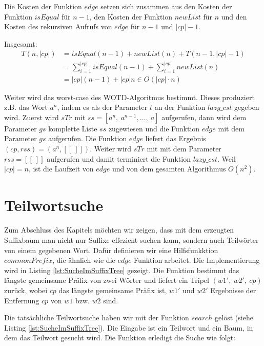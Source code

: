 \documentclass[12pt]{report}
\newcommand{\abs}[1]{\left|#1\right|}
\begin{document}
Die Kosten der Funktion $edge$ setzen sich zusammen aus den Kosten der Funktion $isEqual$ für $n - 1$, den Kosten der Funktion $newList$ für $n$ und den Kosten des rekursiven Aufrufs von $edge$ für $n - 1$ und $\abs{cp} - 1$.

Insgesamt:
\begin{align*}
    T(n,\abs{cp}) &= isEqual(n - 1) + newList(n) + T(n-1,\abs{cp}-1) \\
                  &= \sum_{i = 1}^{\abs{cp}}{isEqual(n-1)} + \sum_{i = 1}^{\abs{cp}}{newList(n)}\\
                  &= \abs{cp} (n - 1) + \abs{cp} n \in O(\abs{cp} \cdot n)
\end{align*}

Weiter wird das worst-case des WOTD-Algoritmus bestimmt. Dieses produziert z.B. das Wort $a^n$, indem es als der Parameter $t$ an der Funktion $lazy\_cst$ gegeben wird. Zuerst wird $sTr$ mit $ss = [a^n,\:a^{n-1}, \dots ,\:a]$ aufgerufen, dann wird dem Parameter $gs$ komplette Liste $ss$ zugewiesen und die Funktion $edge$ mit dem Parameter $gs$ aufgerufen. Die Funktion $edge$ liefert das Ergebnis $(cp,rss) = (a^n, [[\:]])$. Weiter wird $sTr$ mit mit dem Parameter $rss = [[\:]]$ aufgerufen und damit terminiert die Funktion $lazy\_cst$. Weil $|cp| = n$, ist die Laufzeit von $edge$ und von dem gesamten Algorithmus $O(n^2)$.

\section{Teilwortsuche}
\label{sec:Teilwortsuche}

Zum Abschluss des Kapitels möchten wir zeigen, dass mit dem erzeugten Suffixbaum man nicht nur Suffixe effezient suchen kann, sondern auch Teilwörter von einem gegebenen Wort. Dafür definieren wir eine Hilfsfunkktion $commonPrefix$, die ähnlich wie die $edge$-Funktion arbeitet. Die Implementierung wird in Listing \ref{lst:SucheImSuffixTree} gezeigt. Die Funktion bestimmt das längste gemeinsame Präfix von zwei Wörter und liefert ein Tripel $(w1',\: w2',\: cp)$ zurück, wobei $cp$ das längste gemeinsame Präfix ist, $w1'$ und $w2'$ Ergebnisse der Entfernung $cp$ von $w1$ bzw. $w2$ sind.

Die tatsächliche Teilwortsuche haben wir mit der Funktion $search$ gelöst (siehe Listing \ref{lst:SucheImSuffixTree}). Die Eingabe ist ein Teilwort und ein Baum, in dem das Teilwort gesucht wird. Die Funktion erledigt die Suche wie folgt:
\end{document}
